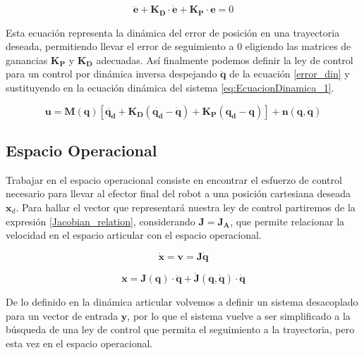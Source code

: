 \begin{equation}
    \boldsymbol{\ddot{e}}+\boldsymbol{K_D\cdot{\dot{e}}}+\boldsymbol{K_P\cdot{e}}=0
    \label{error_din}
\end{equation}

Esta ecuación representa la dinámica del error de posición en una trayectoria
deseada, permitiendo llevar el error de seguimiento a 0 eligiendo las matrices
de ganancias $\boldsymbol{K_P}$ y $\boldsymbol{K_D}$ adecuadas. Así finalmente
podemos definir la ley de control para un control por dinámica inversa
despejando $\boldsymbol{\ddot{q}}$ de la ecuación \ref{error_din} y
sustituyendo en la ecuación dinámica del sistema \ref{eq:EcuacionDinamica_1}.

\begin{equation}
    \boldsymbol{u} =
    \boldsymbol{M(q)}[\boldsymbol{\ddot{q_d}}+\boldsymbol{K_D}(\boldsymbol{\dot{q_d}}-\boldsymbol{\dot{q}})+\boldsymbol{K_P}(\boldsymbol{{q_d}}-\boldsymbol{{q}})]+\boldsymbol{n(q,\dot{q})}
\end{equation}

\subsection{Espacio Operacional}
Trabajar en el espacio operacional consiste en encontrar el esfuerzo de control
necesario para llevar al efector final del robot a una posición cartesiana
deseada $\boldsymbol{x}_d$. Para hallar el vector que representará nuestra ley de control
partiremos de la expresión \ref{Jacobian_relation}, considerando $\boldsymbol{J}=\boldsymbol{J_A}$, que
permite relacionar la velocidad en el espacio articular con el espacio
operacional.

\begin{equation}
    \dot{\boldsymbol{x}}  = \boldsymbol{v} = \boldsymbol{J\dot{q}}
\end{equation}

\begin{equation}
    \boldsymbol{\ddot{x}} = \boldsymbol{J(q)\cdot\ddot{q}} +
    \dot{\boldsymbol{J}}(\boldsymbol{q,\dot{q}})\cdot\dot{\boldsymbol{q} }
\end{equation}

De lo definido en la dinámica articular volvemos a definir un sistema
desacoplado para un vector de entrada $\boldsymbol{y}$, por lo que el sistema vuelve a ser
simplificado a la búsqueda de una ley de control que permita el seguimiento a
la trayectoria, pero esta vez en el espacio operacional.

